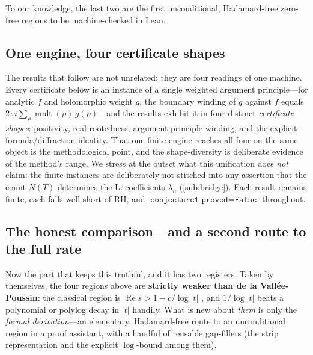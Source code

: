To our knowledge, the last two are the first unconditional, Hadamard-free
zero-free regions to be machine-checked in Lean.

\subsection{One engine, four certificate shapes}

The results that follow are not unrelated: they are four readings of one machine.
Every certificate below is an instance of a single weighted argument
principle---for analytic $f$ and holomorphic weight $g$, the boundary winding of
$g$ against $f$ equals $2\pi i \sum_{\rho} \operatorname{mult}(\rho)\, g(\rho)$---and
the results exhibit it in four distinct \emph{certificate shapes}: positivity,
real-rootedness, argument-principle winding, and the explicit-formula/diffraction
identity. That one finite engine reaches all four on the same object is the
methodological point, and the shape-diversity is deliberate evidence of the
method's range. We stress at the outset what this unification does \emph{not}
claim: the finite instances are deliberately not stitched into any assertion that
the count $N(T)$ determines the Li coefficients $\lambda_n$ (\cref{sub:bridge}).
Each result remains finite, each falls well short of RH, and
$\texttt{conjecture1\_proved} = \texttt{False}$ throughout.

\subsection{The honest comparison---and a second route to the full rate}

Now the part that keeps this truthful, and it has two registers. Taken by
themselves, the four regions above are \textbf{strictly weaker than de la
Vallée-Poussin}: the classical region is $\operatorname{Re} s > 1 - c/\log|t|$
\cite{dlvp1896}, and $1/\log|t|$ beats a polynomial or polylog decay in $|t|$
handily. What is new about \emph{them} is only the \emph{formal derivation}---an
elementary, Hadamard-free route to an unconditional region in a proof assistant,
with a handful of reusable gap-fillers (the strip representation and the explicit
$\log$-bound among them).

